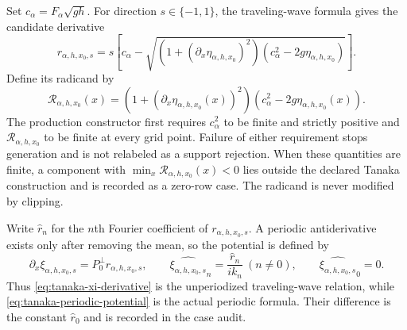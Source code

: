 \documentclass[11pt]{article}
\begin{document}
Set $c_\alpha=F_\alpha\sqrt{gh}$.  For direction
$s\in\{-1,1\}$, the traveling-wave formula gives the candidate derivative
\begin{equation}
  r_{\alpha,h,x_0,s}
  =s\left[c_\alpha-
    \sqrt{(1+(\partial_x\eta_{\alpha,h,x_0})^2)
           (c_\alpha^2-2g\eta_{\alpha,h,x_0})}\right].
  \label{eq:tanaka-xi-derivative}
\end{equation}
Define its radicand by
\begin{equation}
  \mathcal R_{\alpha,h,x_0}(x)
  =
  \left(1+(\partial_x\eta_{\alpha,h,x_0}(x))^2\right)
  \left(c_\alpha^2-2g\eta_{\alpha,h,x_0}(x)\right).
  \label{eq:tanaka-radicand}
\end{equation}
The production constructor first requires $c_\alpha^2$ to be finite and
strictly positive and $\mathcal R_{\alpha,h,x_0}$ to be finite at every grid
point.  Failure of either requirement stops generation and is not relabeled
as a support rejection.  When these quantities are finite, a component with
$\min_x\mathcal R_{\alpha,h,x_0}(x)<0$ lies outside the declared Tanaka
construction and is recorded as a zero-row case.  The radicand is never
modified by clipping.

Write $\widehat r_n$ for the $n$th Fourier coefficient of
$r_{\alpha,h,x_0,s}$.  A periodic antiderivative exists only after removing
the mean, so the potential is defined by
\begin{equation}
  \partial_x\xi_{\alpha,h,x_0,s}=P_0^\perp r_{\alpha,h,x_0,s},
  \qquad
  \widehat{\xi_{\alpha,h,x_0,s}}_n
    =\frac{\widehat r_n}{ik_n}\ (n\ne0),
  \qquad \widehat{\xi_{\alpha,h,x_0,s}}_0=0.
  \label{eq:tanaka-periodic-potential}
\end{equation}
Thus \eqref{eq:tanaka-xi-derivative} is the unperiodized traveling-wave
relation, while \eqref{eq:tanaka-periodic-potential} is the actual periodic
formula.  Their difference is the constant
$\widehat r_0$ and is recorded in the case audit.
\end{document}
